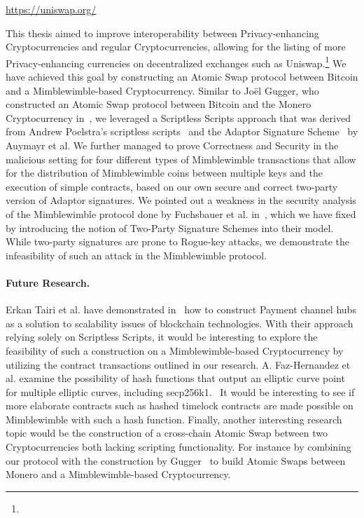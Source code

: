 \urldef{\urluniswp}\url{https://uniswap.org/}

This thesis aimed to improve interoperability between Privacy-enhancing Cryptocurrencies and regular Cryptocurrencies, allowing for the listing of more Privacy-enhancing currencies on decentralized exchanges such as Uniswap.\footnote{\urluniswp}
We have achieved this goal by constructing an Atomic Swap protocol between Bitcoin and a Mimblewimble-based Cryptocurrency.
Similar to Joël Gugger, who constructed an Atomic Swap protocol between Bitcoin and the Monero Cryptocurrency in~\cite{gugger2020bitcoin}, we leveraged a Scriptless Scripts approach that was derived from Andrew Poelstra's scriptless scripts~\cite{poelstra2017scriptless} and the Adaptor Signature Scheme~\cite{aumayr2020bitcoinchannels} by Auymayr et al.
We further managed to prove Correctness and Security in the malicious setting for four different types of Mimblewimble transactions that allow for the distribution of Mimblewimble coins between multiple keys and the execution of simple contracts, based on our own secure and correct two-party version of Adaptor signatures.
We pointed out a weakness in the security analysis of the Mimblewimble protocol done by Fuchsbauer et al. in~\cite{fuchsbauer2019aggregate}, which we have fixed by introducing the notion of Two-Party Signature Schemes into their model.
While two-party signatures are prone to Rogue-key attacks, we demonstrate the infeasibility of such an attack in the Mimblewimble protocol.

\paragraph{Future Research.} Erkan Tairi et al. have demonstrated in~\cite{tairi2019a2l} how to construct Payment channel hubs as a solution to scalability issues of blockchain technologies.
With their approach relying solely on Scriptless Scripts, it would be interesting to explore the feasibility of such a construction on a Mimblewimble-based Cryptocurrency by utilizing the contract transactions outlined in our research.
A. Faz-Hernandez et al. examine the possibility of hash functions that output an elliptic curve point for multiple elliptic curves, including secp256k1.~\cite{hernandez2020hashing} It would be interesting to see if more elaborate contracts such as hashed timelock contracts are made possible on Mimblewimble with such a hash function.
Finally, another interesting research topic would be the construction of a cross-chain Atomic Swap between two Cryptocurrencies both lacking scripting functionality.
For instance by combining our protocol with the construction by Gugger~\cite{gugger2020bitcoin} to build Atomic Swaps between Monero and a Mimblewimble-based Cryptocurrency.


